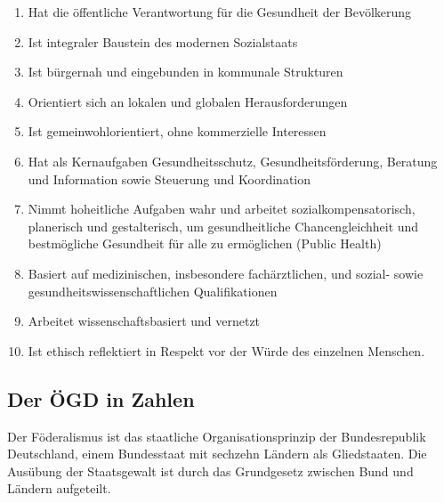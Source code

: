 \documentclass{article}
\begin{document}
\begin{enumerate}
\item Hat die öffentliche Verantwortung für die Gesundheit der Bevölkerung


\item Ist integraler Baustein des modernen Sozialstaats


\item Ist bürgernah und eingebunden in kommunale Strukturen


\item Orientiert sich an lokalen und globalen Herausforderungen


\item Ist gemeinwohlorientiert, ohne kommerzielle Interessen


\item Hat als Kernaufgaben Gesundheitsschutz, Gesundheitsförderung, Beratung und Information sowie Steuerung und Koordination


\item Nimmt hoheitliche Aufgaben wahr und arbeitet sozialkompensatorisch, planerisch und gestalterisch, um gesundheitliche Chancengleichheit und bestmögliche Gesundheit für alle zu ermöglichen (Public Health)


\item Basiert auf medizinischen, insbesondere fachärztlichen, und sozial- sowie gesundheitswissenschaftlichen Qualifikationen


\item Arbeitet wissenschaftsbasiert und vernetzt


\item Ist ethisch reflektiert in Respekt vor der Würde des einzelnen Menschen.


\end{enumerate}

\subsection{Der ÖGD in Zahlen}\label{viv-id-https:003a:002f:002fconsortium:002egithub:002eio:002flt01:002fwebbuch:002fnew-netbuch:002exhtml:0023H837015}



Der Föderalismus ist das staatliche Organisationsprinzip der Bundesrepublik Deutschland, einem Bundesstaat mit sechzehn Ländern als Gliedstaaten. Die Ausübung der Staatsgewalt ist durch das Grundgesetz zwischen Bund und Ländern aufgeteilt.
\end{document}
